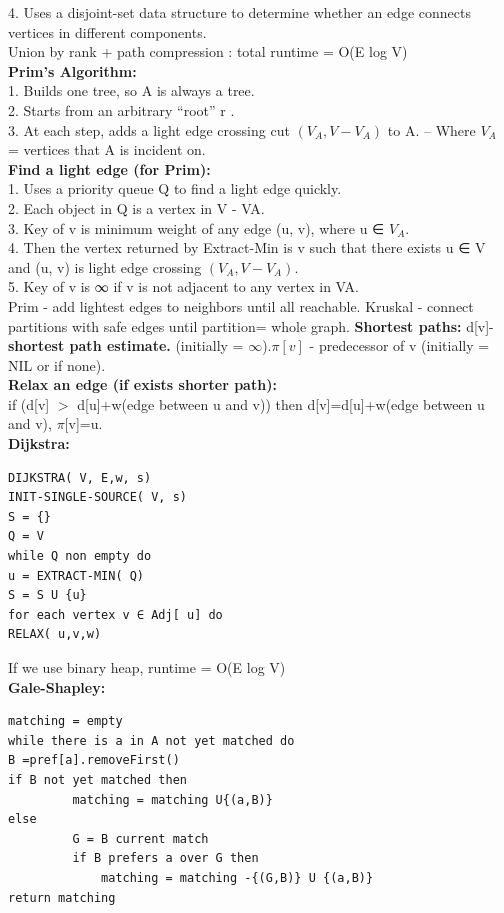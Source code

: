 \documentclass[paper=a4, fontsize=11pt]{scrartcl} %
\begin{document}
4. Uses	a	 disjoint-set	data	structure	 to	determine	whether	an	
edge	connects	vertices	in	different	components.\\
Union by rank + path compression : total runtime = O(E log V)\\
\textbf{Prim's Algorithm: }\\
1. Builds	 one	tree,	so	 A	 is	always	a	tree.	\\
2. Starts	from	an	arbitrary	 “root” r	 .	\\
3. At	each	step,	 adds	a	light	edge	 crossing	cut	 $(V_A, V	 - V_A)$ to A.
– Where	 $V_A$ = vertices	that	 A	 is	incident	on.\\
\textbf{Find a light edge (for Prim):}\\
1. Uses	a	 priority	queue	 Q	to	find	a		light	edge	quickly.\\	
2. Each	object	in	 Q	 is	a	vertex	in	V - VA.	\\
3. Key	of	 v is	minimum	weight	of	any	edge	 (u, v),	where	 u	 ∈ $V_A$.	\\
4. Then	the	vertex	returned	by	Extract-Min	is	 v such	that	there	
exists	 u	 ∈ V  and	 (u, v) is	light	edge	crossing	 $(V_A, V - V_A)$.	\\
5. Key	of	 v is	 ∞ if	 v is	not	adjacent	to	any	vertex	in	VA.\\
Prim - add lightest edges to neighbors until all reachable. Kruskal - connect partitions with safe edges until partition= whole graph.
\textbf{Shortest paths:} d[v]- \textbf{shortest path estimate.} (initially = $\infty$).$\pi[v]$ - predecessor of v (initially = NIL or if none).\\
\textbf{Relax an edge (if exists shorter path):}\\
if (d[v] $>$ d[u]+w(edge between u and v)) then d[v]=d[u]+w(edge between u and v), $\pi$[v]=u.\\
\textbf{Dijkstra: }\\
\begin{lstlisting}[frame=single]
DIJKSTRA( V, E,w, s)
INIT-SINGLE-SOURCE( V, s)
S = {}
Q = V
while Q non empty do
u = EXTRACT-MIN( Q)
S = S U {u}
for each vertex v ∈ Adj[ u] do
RELAX( u,v,w)
\end{lstlisting}
If we use binary heap, runtime = O(E log V)\\
\textbf{Gale-Shapley:} \\
\begin{lstlisting}[frame=single]
matching = empty
while there is a in A not yet matched do	
B =pref[a].removeFirst()	
if B not yet matched then
	 	 matching = matching U{(a,B)}	
else	
	 	 G = B current match 	
	 	 if B prefers a over G then
	 	 	 matching = matching -{(G,B)} U {(a,B)}
return matching
\end{lstlisting}
\end{document}

